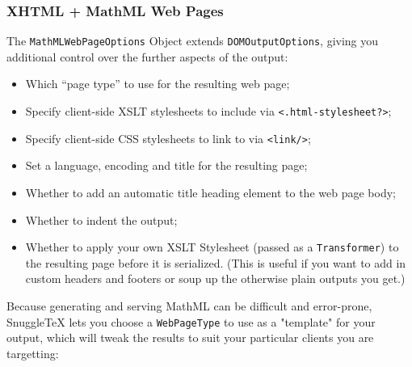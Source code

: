 \subsubsection*{XHTML + MathML Web Pages}

The \verb|MathMLWebPageOptions| Object extends \verb|DOMOutputOptions|,
giving you additional control over the further aspects of the output:

\begin{itemize}
  \item Which ``page type'' to use for the resulting web page;
  \item Specify client-side XSLT stylesheets to include via \verb|<.html-stylesheet?>|;
  \item Specify client-side CSS stylesheets to link to via \verb|<link/>|;
  \item Set a language, encoding and title for the resulting page;
  \item Whether to add an automatic title heading element to the web page body;
  \item Whether to indent the output;
  \item Whether to apply your own XSLT Stylesheet (passed as a \verb|Transformer|) to
    the resulting page before it is serialized. (This is useful if you want to add
    in custom headers and footers or soup up the otherwise plain outputs you get.)
\end{itemize}

Because generating and serving MathML can be difficult and error-prone, SnuggleTeX lets
you choose a \verb|WebPageType| to use as a "template" for your output, which will tweak
the results to suit your particular clients you are targetting:

